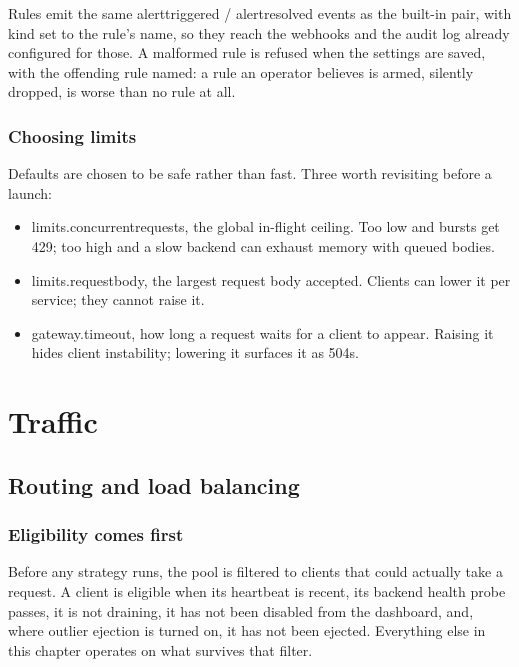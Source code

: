 \documentclass[11pt,a4paper,oneside]{book}
\newcommand{\aperiobreakableunderscore}{\textunderscore\allowbreak}
\newcommand{\aperiocodebreaks}{\XeTeXinterchartokenstate=1 }
\newcommand{\aperiocodebreaks}{}
\DeclareRobustCommand{\code}[1]{{\ttfamily\small\aperiocodebreaks
  \let\_\aperiobreakableunderscore#1}}
\begin{document}
Rules emit the same \code{alert\_triggered} / \code{alert\_resolved} events
as the built-in pair, with \code{kind} set to the rule's name, so they reach
the webhooks and the audit log already configured for those. A malformed
rule is refused when the settings are saved, with the offending rule named:
a rule an operator believes is armed, silently dropped, is worse than no
rule at all.

\section{Choosing limits}

Defaults are chosen to be safe rather than fast. Three worth revisiting
before a launch:

\begin{itemize}[leftmargin=1.3em]
  \item \code{limits.concurrent\_requests}, the global in-flight
        ceiling. Too low and bursts get \code{429}; too high and a slow
        backend can exhaust memory with queued bodies.
  \item \code{limits.request\_body}, the largest request body accepted.
        Clients can lower it per service; they cannot raise it.
  \item \code{gateway.timeout}, how long a request waits for a
        client to appear. Raising it hides client instability; lowering it
        surfaces it as \code{504}s.
\end{itemize}

\part{Traffic}

\chapter{Routing and load balancing}
\label{ch:routing}

\section{Eligibility comes first}

Before any strategy runs, the pool is filtered to clients that could
actually take a request. A client is eligible when its heartbeat is
recent, its backend health probe passes, it is not draining, it has not
been disabled from the dashboard, and, where outlier ejection is turned
on, it has not been ejected. Everything else in this chapter operates on
what survives that filter.
\end{document}
